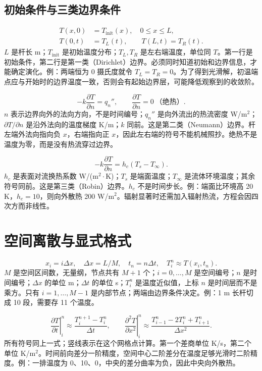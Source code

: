 \subsection{初始条件与三类边界条件}
\begin{align}
T(x,0)&=T_{\mathrm{init}}(x),\quad 0\leq x\leq L,\\
T(0,t)&=T_L(t),\qquad T(L,t)=T_R(t).
\end{align}
$L$ 是杆长 m；$T_{\mathrm{init}}$ 是初始温度分布；$T_L,T_R$ 是左右端温度，单位同 $T$。第一行是初始条件，第二行是第一类（Dirichlet）边界。必须同时知道初始和边界信息，才能确定演化。例：两端恒为 0 摄氏度就令 $T_L=T_R=0$。为了得到光滑解，初温端点应与开始时的边界温度一致，否则会有起始边界层，可能降低观察到的收敛阶。

\begin{equation}
-k\frac{\partial T}{\partial n}=q_n'',\qquad
\frac{\partial T}{\partial n}=0\ \text{（绝热）}.
\end{equation}
$n$ 表示边界向外的法向方向，不是时间编号；$q_n''$ 是向外流出的热流密度 W/m$^2$；$\partial T/\partial n$ 是沿外法向的温度梯度 K/m；$k$ 同前。这是第二类（Neumann）边界。杆左端外法向指向负 $x$，右端指向正 $x$，因此左右端的符号不能机械照抄。绝热不是温度为零，而是没有热流穿过边界。

\begin{equation}
-k\frac{\partial T}{\partial n}=h_c(T_s-T_\infty).
\end{equation}
$h_c$ 是表面对流换热系数 W/(m$^2\cdot$K)；$T_s$ 是端面温度；$T_\infty$ 是流体环境温度；其余符号同前。这是第三类（Robin）边界。$h_c$ 不是时间步长。例：端面比环境高 20 K，$h_c=10$，则向外散热 200 W/m$^2$。辐射显著时还需加入辐射热流，方程会因四次方而非线性。

\section{空间离散与显式格式}
\begin{equation}
x_i=i\Delta x,\quad \Delta x=L/M,\quad t_n=n\Delta t,\quad T_i^n\approx T(x_i,t_n).
\end{equation}
$M$ 是空间区间数，无量纲，节点共有 $M+1$ 个；$i=0,\ldots,M$ 是空间编号；$n$ 是时间编号；$\Delta x$ 的单位 m；$\Delta t$ 的单位 s；$T_i^n$ 是温度近似值，上标 $n$ 是时间层而不是乘方。只有 $i=1,\ldots,M-1$ 是内部节点；两端由边界条件决定。例：1 m 长杆切成 10 段，需要存 11 个温度。

\begin{equation}
\left.\frac{\partial T}{\partial t}\right|_i^n\approx\frac{T_i^{n+1}-T_i^n}{\Delta t},\qquad
\left.\frac{\partial^2T}{\partial x^2}\right|_i^n\approx\frac{T_{i-1}^n-2T_i^n+T_{i+1}^n}{\Delta x^2}.
\end{equation}
所有符号同上一式；竖线表示在这个网格点计算。第一个差商单位 K/s，第二个单位 K/m$^2$。时间前向差分一阶精度，空间中心二阶差分在温度足够光滑时二阶精度。例：一排温度为 0、10、0，中央的差分曲率为负，因此中央向外散热。

